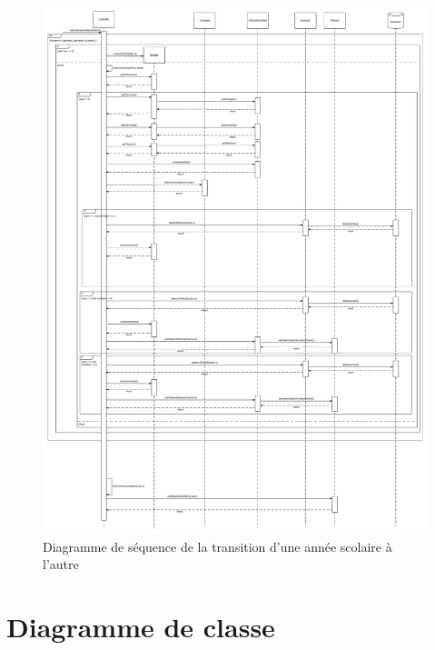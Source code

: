 \documentclass{scrreprt}
\begin{document}
\newpage
\begin{figure}[h]
\centering
\includegraphics[width=15cm]{images/newYearSeqDiag.png}
\caption{Diagramme de séquence de la transition d'une année scolaire à l'autre}
\end{figure}

\newpage
\chapter{Diagramme de classe}


\end{document}
